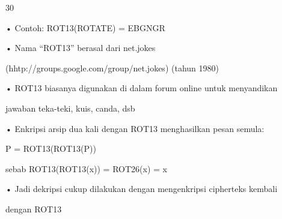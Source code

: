 \documentclass{article}
\begin{document}

30

• Contoh:  ROT13(ROTATE) = EBGNGR

• Nama “ROT13” berasal dari net.jokes

 (hhtp://groups.google.com/group/net.jokes)  (tahun 1980)

• ROT13 biasanya digunakan di dalam forum online untuk menyandikan 

jawaban teka-teki, kuis,  canda, dsb 

• Enkripsi arsip dua kali dengan ROT13 menghasilkan pesan semula:



P = ROT13(ROT13(P)) 

 sebab        ROT13(ROT13(x)) = ROT26(x) = x

• Jadi dekripsi cukup dilakukan dengan mengenkripsi cipherteks kembali 

dengan ROT13
\end{document}
